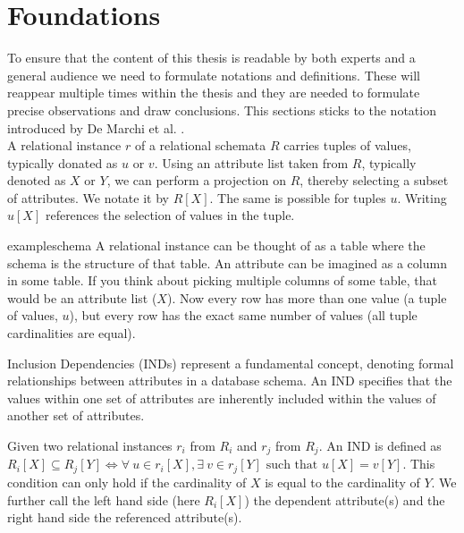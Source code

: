 \chapter{Foundations}

To ensure that the content of this thesis is readable by both experts and a general audience we need to formulate notations and definitions. These will reappear multiple times within the thesis and they are needed to formulate precise observations and draw conclusions. This sections sticks to the notation introduced by De Marchi et al. \cite{marchi2009unary}. \\

\noindent A relational instance $r$ of a relational schemata $R$ carries tuples of values, typically donated as $u$ or $v$. Using an attribute list taken from $R$, typically denoted as $X$ or $Y$, we can perform a projection on $R$, thereby selecting a subset of attributes. We notate it by $R[X]$. The same is possible for tuples $u$. Writing $u[X]$ references the selection of values in the tuple. \\

\begin{restatable}{example}{schema}\label{exmp:schema}
A relational instance can be thought of as a table where the schema is the structure of that table. An attribute can be imagined as a column in some table. If you think about picking multiple columns of some table, that would be an attribute list ($X$). Now every row has more than one value (a tuple of values, $u$), but every row has the exact same number of values (all tuple cardinalities are equal).
\end{restatable}

\noindent Inclusion Dependencies (INDs) represent a fundamental concept, denoting formal relationships between attributes in a database schema. An IND specifies that the values within one set of attributes are inherently included within the values of another set of attributes.

\begin{definition}\label{def:inds}
    Given two relational instances $r_i$ from $R_i$ and $r_j$ from $R_j$. An IND is defined as $R_i[X] \subseteq R_j[Y] \iff \forall \: u \in r_i[X], \exists \: v \in r_j[Y] \text{ such that } u[X] = v[Y]$. This condition can only hold if the cardinality of $X$ is equal to the cardinality of $Y$. We further call the left hand side (here $R_i[X]$) the dependent attribute(s) and the right hand side the referenced attribute(s).
\end{definition}

